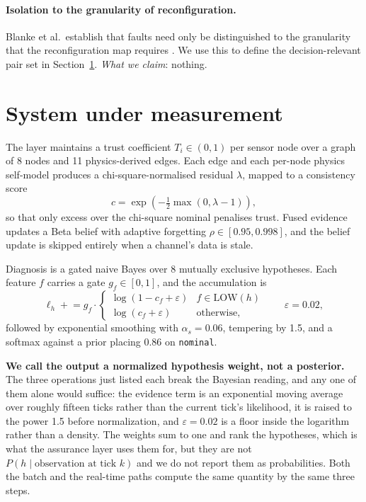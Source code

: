 \documentclass[11pt,a4paper]{article}
\newcommand{\code}[1]{\texttt{\small #1}}
\begin{document}
\paragraph{Isolation to the granularity of reconfiguration.}
Blanke et al.\ establish that faults need only be distinguished to the
granularity that the reconfiguration map requires \cite{blanke2003ftc}. We use
this to define the decision-relevant pair set in
Section~\ref{sec:system}. \emph{What we claim}: nothing.

\section{System under measurement}
\label{sec:system}

The layer maintains a trust coefficient $T_i \in (0,1)$ per sensor node over a
graph of 8 nodes and 11 physics-derived edges. Each edge and each per-node
physics self-model produces a chi-square-normalised residual $\lambda$, mapped
to a consistency score
\begin{equation}
c = \exp\!\left(-\tfrac{1}{2}\max(0, \lambda - 1)\right),
\end{equation}
so that only excess over the chi-square nominal penalises trust. Fused
evidence updates a Beta belief with adaptive forgetting $\rho \in [0.95,
0.998]$, and the belief update is skipped entirely when a channel's data is
stale.

Diagnosis is a gated naive Bayes over 8 mutually exclusive hypotheses. Each
feature $f$ carries a gate $g_f \in [0,1]$, and the accumulation is
\begin{equation}
\ell_h \mathrel{+}= g_f \cdot
\begin{cases}
\log(1 - c_f + \varepsilon) & f \in \mathrm{LOW}(h)\\
\log(c_f + \varepsilon) & \text{otherwise,}
\end{cases}
\qquad \varepsilon = 0.02,
\end{equation}
followed by exponential smoothing with $\alpha_s = 0.06$, tempering by 1.5,
and a softmax against a prior placing 0.86 on \code{nominal}.

\textbf{We call the output a normalized hypothesis weight, not a posterior.}
The three operations just listed each break the Bayesian reading, and any one
of them alone would suffice: the evidence term is an exponential moving average
over roughly fifteen ticks rather than the current tick's likelihood, it is
raised to the power 1.5 before normalization, and $\varepsilon = 0.02$ is a
floor inside the logarithm rather than a density. The weights sum to one and
rank the hypotheses, which is what the assurance layer uses them for, but they
are not $P(h \mid \text{observation at tick } k)$ and we do not report them as
probabilities. Both the batch and the real-time paths compute the same
quantity by the same three steps.
\end{document}
